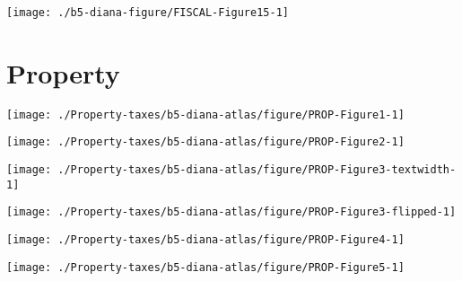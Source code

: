 \documentclass[tikz]{standalone}\usepackage[]{graphicx}\usepackage[]{color}
\newenvironment{knitrout}{}{} %
\begin{document}
\begin{knitrout}
\color{fgcolor}
\texttt{[image: ./b5-diana-figure/FISCAL-Figure15-1]} 

\end{knitrout}

\section{Property}



\begin{knitrout}
\color{fgcolor}
\texttt{[image: ./Property-taxes/b5-diana-atlas/figure/PROP-Figure1-1]} 

\end{knitrout}

\begin{knitrout}
\color{fgcolor}
\texttt{[image: ./Property-taxes/b5-diana-atlas/figure/PROP-Figure2-1]} 

\end{knitrout}

\clearpage
\begin{knitrout}
\color{fgcolor}
\texttt{[image: ./Property-taxes/b5-diana-atlas/figure/PROP-Figure3-textwidth-1]} 

\end{knitrout}
\clearpage
\begin{knitrout}
\color{fgcolor}
\texttt{[image: ./Property-taxes/b5-diana-atlas/figure/PROP-Figure3-flipped-1]} 

\end{knitrout}

\clearpage
\begin{knitrout}
\color{fgcolor}
\texttt{[image: ./Property-taxes/b5-diana-atlas/figure/PROP-Figure4-1]} 

\end{knitrout}
\clearpage

\begin{knitrout}
\color{fgcolor}
\texttt{[image: ./Property-taxes/b5-diana-atlas/figure/PROP-Figure5-1]} 

\end{knitrout}
\end{document}

